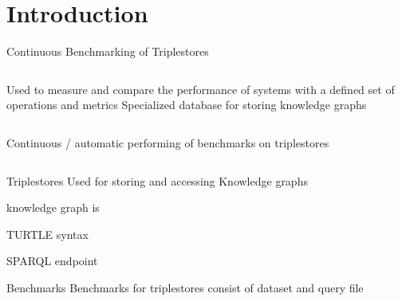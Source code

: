 \section{Introduction}
\begin{frame}{Continuous Benchmarking of Triplestores}
	
	
	
	
	
	\begin{columns}[T]
		Used to measure and compare the performance of systems with a defined set of operations and metrics
		Specialized database for storing knowledge graphs
	\end{columns}
	
	\vspace{1cm}
	
	\begin{columns}[T]

		Continuous / automatic performing of benchmarks on triplestores

		
	\end{columns}
	
	
	
\end{frame}


\begin{frame}{Triplestores}
	Used for storing and accessing Knowledge graphs
	
	knowledge graph is
	
	TURTLE syntax
	
	SPARQL endpoint
\end{frame}

\begin{frame}{Benchmarks}
	Benchmarks for triplestores consist of dataset and query file
\end{frame}
